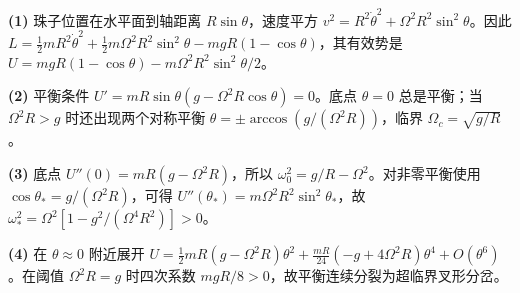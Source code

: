 \par\noindent\textbf{(1)} 珠子位置在水平面到轴距离 \(R\sin\theta\)，速度平方 \(v^2=R^2\dot\theta^2+\Omega^2R^2\sin^2\theta\)。因此 \(L=\tfrac12mR^2\dot\theta^2+\tfrac12m\Omega^2R^2\sin^2\theta-mgR(1-\cos\theta)\)，其有效势是 \(U=m gR(1-\cos\theta)-m\Omega^2R^2\sin^2\theta/2\)。
\par\noindent\textbf{(2)} 平衡条件 \(U'=mR\sin\theta(g-\Omega^2R\cos\theta)=0\)。底点 \(\theta=0\) 总是平衡；当 \(\Omega^2R>g\) 时还出现两个对称平衡 \(\theta=\pm\arccos(g/(\Omega^2R))\)，临界 \(\Omega_c=\sqrt{g/R}\)。
\par\noindent\textbf{(3)} 底点 \(U''(0)=mR(g-\Omega^2R)\)，所以 \(\omega_0^2=g/R-\Omega^2\)。对非零平衡使用 \(\cos\theta_*=g/(\Omega^2R)\)，可得 \(U''(\theta_*)=m\Omega^2R^2\sin^2\theta_*\)，故 \(\omega_*^2=\Omega^2[1-g^2/(\Omega^4R^2)]>0\)。
\par\noindent\textbf{(4)} 在 \(\theta\approx0\) 附近展开 \(U=\tfrac12mR(g-\Omega^2R)\theta^2+\frac{mR}{24}(-g+4\Omega^2R)\theta^4+O(\theta^6)\)。在阈值 \(\Omega^2R=g\) 时四次系数 \(m gR/8>0\)，故平衡连续分裂为超临界叉形分岔。
